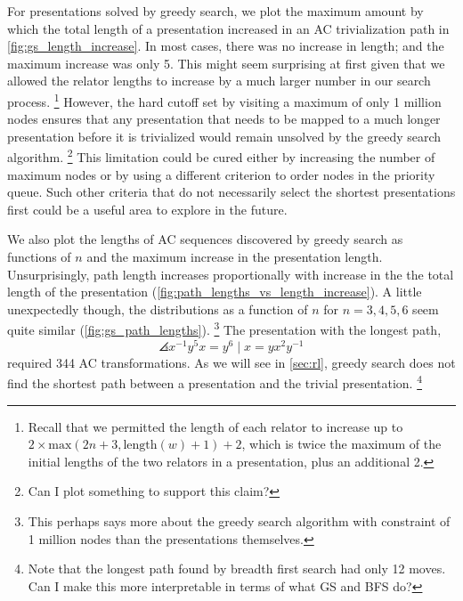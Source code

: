 For presentations solved by greedy search, we plot the maximum amount by which the total length of a presentation increased in an AC trivialization path in \autoref{fig:gs_length_increase}. In most cases, there was no increase in length; and the maximum increase was only 5. This might seem surprising at first given that we allowed the relator lengths to increase by a much larger number in our search process. 
\footnote{Recall that we permitted the length of each relator to increase up to \(2 \times \text{max}(2n+3, \text{length}(w)+1) + 2\), which is twice the maximum of the initial lengths of the two relators in a presentation, plus an additional 2.} However, the hard cutoff set by visiting a maximum of only 1 million nodes ensures that any presentation that needs to be mapped to a much longer presentation before it is trivialized would remain unsolved by the greedy search algorithm. 
\footnote{Can I plot something to support this claim?}
This limitation could be cured either by increasing the number of maximum nodes or by using a different criterion to order nodes in the priority queue. Such other criteria that do not necessarily select the shortest presentations first could be a useful area to explore in the future.
\newline

We also plot the lengths of AC sequences discovered by greedy search as functions of $n$ and the maximum increase in the presentation length. Unsurprisingly, path length increases proportionally with increase in the the total length of the presentation (\autoref{fig:path_lengths_vs_length_increase}). A little unexpectedly though, the distributions as a function of $n$ for $n = 3, 4, 5, 6$ seem quite similar (\autoref{fig:gs_path_lengths}).
\footnote{This perhaps says more about the greedy search algorithm with constraint of 1 million nodes than the presentations themselves.}
The presentation with the longest path,
\[
\angles{x^{-1} y^5 x = y^6 \mid  x = y x^2 y^{-1}}
\]
required 344 AC transformations. As we will see in \autoref{sec:rl}, greedy search does not find the shortest path between a presentation and the trivial presentation.
\footnote{Note that the longest path found by breadth first search had only 12 moves. Can I make this more interpretable in terms of what GS and BFS do?}
	
